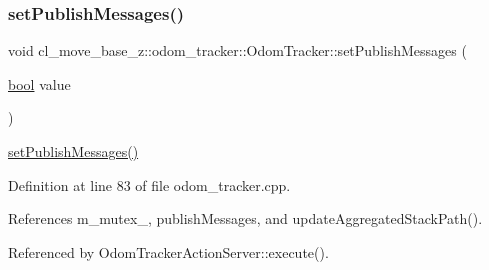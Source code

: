\subsubsection{\texorpdfstring{set\+Publish\+Messages()}{setPublishMessages()}}
{\footnotesize\ttfamily void cl\+\_\+move\+\_\+base\+\_\+z\+::odom\+\_\+tracker\+::\+Odom\+Tracker\+::set\+Publish\+Messages (\begin{DoxyParamCaption}\item[{\hyperlink{classbool}{bool}}]{value }\end{DoxyParamCaption})}

\hyperlink{classcl__move__base__z_1_1odom__tracker_1_1OdomTracker_a3b3cf9010e4e4fe4f96cfafd5a529517}{set\+Publish\+Messages()} 

Definition at line 83 of file odom\+\_\+tracker.\+cpp.



References m\+\_\+mutex\+\_\+, publish\+Messages, and update\+Aggregated\+Stack\+Path().



Referenced by Odom\+Tracker\+Action\+Server\+::execute().


